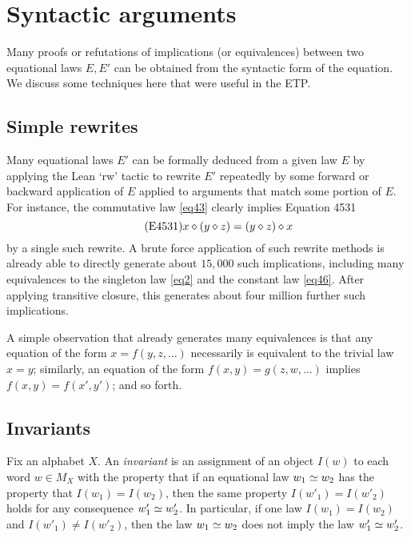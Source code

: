 
\section{Syntactic arguments}\label{syntactic-sec}

Many proofs or refutations of implications (or equivalences) between two equational laws $E,E'$ can be obtained from the syntactic form of the equation.  We discuss some techniques here that were useful in the ETP.

\subsection{Simple rewrites}\label{rewrite-sec}

Many equational laws $E'$ can be formally deduced from a given law $E$ by applying the Lean `rw' tactic to rewrite $E'$ repeatedly by some forward or backward application of $E$ applied to arguments that match some portion of $E$.  For instance, the commutative law \eqref{eq43} clearly implies Equation 4531
\begin{equation}\label{eq4531}\tag{E4531}
    x \diamond (y \diamond z) = (y \diamond z) \diamond x
\end{equation}
by a single such rewrite.  A brute force application of such rewrite methods is already able to directly generate about $15,000$ such implications, including many equivalences to the singleton law \eqref{eq2} and the constant law \eqref{eq46}.  After applying transitive closure, this generates about four million further such implications.

A simple observation that already generates many equivalences is that any equation of the form $x = f(y,z,\dots)$ necessarily is equivalent to the trivial law $x = y$; similarly, an equation of the form $f(x,y) = g(z,w,\dots)$ implies $f(x,y) = f(x',y')$; and so forth.

\subsection{Invariants}

Fix an alphabet $X$. An \emph{invariant} is an assignment of an object $I(w)$ to each word $w \in M_X$ with the property that if an equational law $w_1 \simeq w_2$ has the property that $I(w_1)=I(w_2)$, then the same property $I(w'_1) = I(w'_2)$ holds for any consequence $w'_1 \simeq w'_2$.  In particular, if one law $I(w_1)=I(w_2)$ and $I(w'_1) \neq I(w'_2)$, then the law $w_1 \simeq w_2$ does not imply the law $w'_1 \simeq w'_2$.

